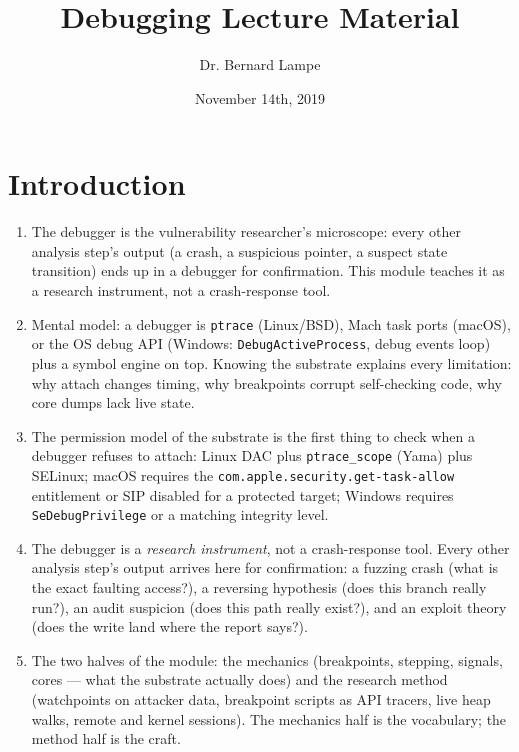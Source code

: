 \documentclass[12pt]{Training}
\title{Debugging Lecture Material}
\author{Dr. Bernard Lampe}
\date{November 14th, 2019}
\begin{document}
\maketitle


\section*{Introduction}
\begin{enumerate}
    \item The debugger is the vulnerability researcher's microscope: every other analysis step's output (a crash, a suspicious pointer, a suspect state transition) ends up in a debugger for confirmation. This module teaches it as a research instrument, not a crash-response tool.
    \item Mental model: a debugger is \lstinline{ptrace} (Linux/BSD), Mach task ports (macOS), or the OS debug API (Windows: \lstinline{DebugActiveProcess}, debug events loop) plus a symbol engine on top. Knowing the substrate explains every limitation: why attach changes timing, why breakpoints corrupt self-checking code, why core dumps lack live state.
    \item The permission model of the substrate is the first thing to check when a debugger refuses to attach: Linux DAC plus \lstinline{ptrace_scope} (Yama) plus SELinux; macOS requires the \lstinline{com.apple.security.get-task-allow} entitlement or SIP disabled for a protected target; Windows requires \lstinline{SeDebugPrivilege} or a matching integrity level.
    \item The debugger is a \emph{research instrument}, not a crash-response tool. Every other analysis step's output arrives here for confirmation: a fuzzing crash (what is the exact faulting access?), a reversing hypothesis (does this branch really run?), an audit suspicion (does this path really exist?), and an exploit theory (does the write land where the report says?).
    \item The two halves of the module: the mechanics (breakpoints, stepping, signals, cores --- what the substrate actually does) and the research method (watchpoints on attacker data, breakpoint scripts as API tracers, live heap walks, remote and kernel sessions). The mechanics half is the vocabulary; the method half is the craft.
\end{enumerate}
\end{document}
